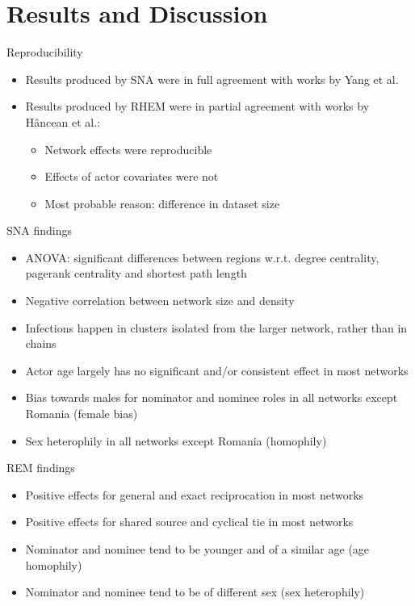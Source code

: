 \documentclass{beamer}
\begin{document}
	\section{Results and Discussion}
	
	\begin{frame}{Reproducibility}
		\begin{itemize}
			\item Results produced by SNA were in full agreement with works by Yang et al.
			\item Results produced by RHEM were in partial agreement with works by H\^ancean et al.:
			\begin{itemize}
				\item Network effects were reproducible
				\item Effects of actor covariates were not
				\item Most probable reason: difference in dataset size
			\end{itemize}
		\end{itemize}
	\end{frame}

	\begin{frame}{SNA findings}
		\begin{itemize}
			\item ANOVA: significant differences between regions w.r.t. degree centrality, pagerank centrality and shortest path length
			\item Negative correlation between network size and density
			\item Infections happen in clusters isolated from the larger network, rather than in chains
			\item Actor age largely has no significant and/or consistent effect in most networks
			\item Bias towards males for nominator and nominee roles in all networks except Romania (female bias)
			\item Sex heterophily in all networks except Romania (homophily)
		\end{itemize}
	\end{frame}

	\begin{frame}{REM findings}
		\begin{itemize}
			\item Positive effects for general and exact reciprocation in most networks
			\item Positive effects for shared source and cyclical tie in most networks
			\item Nominator and nominee tend to be younger and of a similar age (age homophily)
			\item Nominator and nominee tend to be of different sex (sex heterophily)
		\end{itemize}
	\end{frame}
\end{document}
